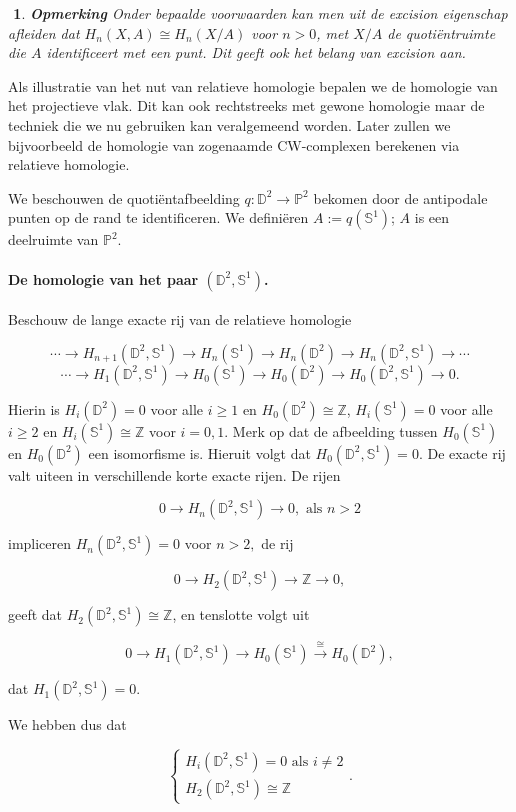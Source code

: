 \documentclass[12pt]{book}
\newcommand{\Z}{\mathbb{Z}}
\newcommand{\D}{\mathbb{D}}
\newcommand{\Sf}{\mathbb{S}}
\newtheorem{opmh}[stelh]{$\!\!$}
\newenvironment{eopm}{\begin{opmh} \em {\bf Opmerking }}{\end{opmh}}
\begin{document}
\begin{eopm} Onder bepaalde voorwaarden kan men uit de excision eigenschap afleiden dat $H_n(X,A)\cong H_n(X/A)$ voor $n>0$, met $X/A$ de quoti\"entruimte die $A$ identificeert met een punt. Dit geeft ook het belang van excision aan.
\end{eopm}


Als illustratie van het nut van relatieve homologie bepalen we de homologie van het projectieve vlak. Dit kan ook rechtstreeks met gewone homologie maar de techniek die we nu gebruiken kan veralgemeend worden. Later zullen we bijvoorbeeld de homologie van zogenaamde CW-complexen berekenen via relatieve homologie.

We beschouwen de quoti\"entafbeelding $q:\D^2\to \mathbb{P}^2$ bekomen door de antipodale punten op de rand te identificeren.
We defini\"eren $A:=q(\Sf^1)$; $A$ is een deelruimte van $\mathbb{P}^2$.

\paragraph{De homologie van het paar $(\D^2, \Sf^1)$.}

Beschouw de lange exacte rij van de relatieve homologie

$$\cdots \to H_{n+1}(\D^2,\Sf^1)\to H_{n}(\Sf^1)\to H_{n}(\D^2)\to H_{n}(\D^2,\Sf^1)\to \cdots $$
$$\cdots \to H_{1}(\D^2,\Sf^1)\to H_{0}(\Sf^1)\to H_{0}(\D^2)\to H_{0}(\D^2,\Sf^1)\to 0.$$

Hierin is $H_i(\D^2)=0$ voor alle $i\geq 1$ en $H_0(\D^2)\cong \Z$, $H_{i}(\Sf^1)=0$ voor alle $i\geq 2$ en $H_i(\Sf^1)\cong \Z$ voor $i=0,1$. Merk op dat de afbeelding tussen $H_0(\Sf^1)$ en $H_{0}(\D^2)$ een isomorfisme is.
Hieruit volgt dat $H_0(\D^2, \Sf^1)=0$. De exacte rij valt uiteen in verschillende korte exacte rijen. De rijen 

$$0\to H_{n}(\D^2,\Sf^1)\to 0, \mbox{ als } n>2 $$

impliceren $H_{n}(\D^2, \Sf^1)=0$ voor $n>2,$ de rij 

$$0\to H_{2}(\D^2,\Sf^1)\to \Z\to  0,$$

geeft dat $H_{2}(\D^2, \Sf^1)\cong \Z$, en tenslotte volgt uit

$$0 \to H_{1}(\D^2,\Sf^1)\to H_{0}(\Sf^1)\stackrel{\cong}{\to} H_{0}(\D^2),$$

dat $H_{1}(\D^2,\Sf^1)=0$.

We hebben dus dat

$$\left\{\begin{array}{l}
H_{i}(\D^2, \Sf^1)=0 \mbox{ als } i\not=2\\
H_{2}(\D^2, \Sf^1)\cong \Z\end{array}\right..$$
\end{document}
